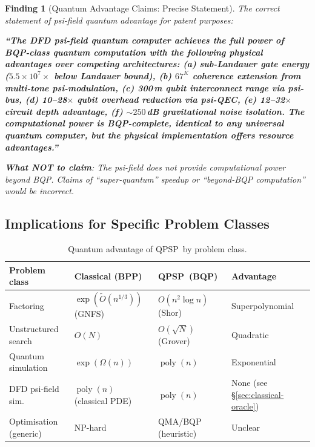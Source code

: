 \documentclass[11pt]{article}
\newtheorem{finding}[theorem]{Finding}
\theoremstyle{definition}
\theoremstyle{remark}
\newcommand{\ee}[1]{\times 10^{#1}}
\newcommand{\QPSP}{\textsc{QPSP}}
\DeclareMathOperator{\poly}{poly}
\begin{document}
\begin{finding}[Quantum Advantage Claims: Precise Statement]
\label{finding:advantage-precise}
The correct statement of psi-field quantum advantage for patent purposes:

\textbf{``The DFD psi-field quantum computer achieves the full power of
BQP-class quantum computation with the following physical advantages
over competing architectures:
(a) sub-Landauer gate energy ($5.5\ee{7}\times$ below Landauer bound),
(b) $67^K$ coherence extension from multi-tone psi-modulation,
(c) 300\,m qubit interconnect range via psi-bus,
(d) 10--28$\times$ qubit overhead reduction via psi-QEC,
(e) 12--32$\times$ circuit depth advantage,
(f) $\sim 250$\,dB gravitational noise isolation.
The computational power is BQP-complete, identical to any universal
quantum computer, but the physical implementation offers resource
advantages.''}

\textbf{What NOT to claim}: The psi-field does not provide computational
power beyond BQP. Claims of ``super-quantum'' speedup or ``beyond-BQP
computation'' would be incorrect.
\end{finding}

\subsection{Implications for Specific Problem Classes}
\label{sec:problem-classes}

\begin{table}[h]
\centering
\caption{Quantum advantage of \QPSP\ by problem class.}
\label{tab:problem-classes}
\begin{tabular}{@{}p{3cm}p{3cm}p{3.5cm}p{3cm}@{}}
\toprule
Problem class & Classical (BPP) & \QPSP\ (BQP) & Advantage \\
\midrule
Factoring & $\exp(\tilde{O}(n^{1/3}))$ (GNFS) &
  $O(n^2\log n)$ (Shor) & Superpolynomial \\
Unstructured search & $O(N)$ & $O(\sqrt{N})$ (Grover) &
  Quadratic \\
Quantum simulation & $\exp(\Omega(n))$ & $\poly(n)$ &
  Exponential \\
DFD psi-field sim.\ & $\poly(n)$ (classical PDE) &
  $\poly(n)$ & None (see \S\ref{sec:classical-oracle}) \\
Optimisation (generic) & NP-hard & QMA/BQP (heuristic) &
  Unclear \\
\bottomrule
\end{tabular}
\end{table}
\end{document}

